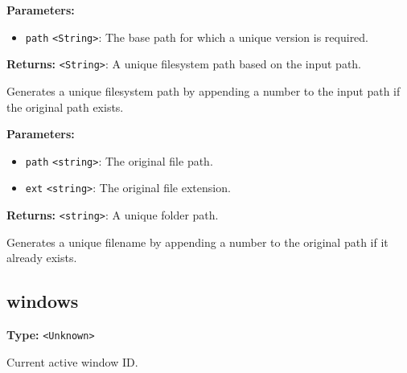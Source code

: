 \documentclass[12pt,a4paper]{article}
\begin{document}
\vspace{5mm}
\noindent {}


\noindent \textbf{Parameters:}
\begin{itemize}
  \item \texttt{path} \texttt{<String>}: The base path for which a unique version is required.
\end{itemize}

\noindent \textbf{Returns:} \texttt{<String>}: A unique filesystem path based on the input path.

\noindent Generates a unique filesystem path by appending a number to the input path if the original path exists.

\vspace{5mm}
\noindent {}


\noindent \textbf{Parameters:}
\begin{itemize}
  \item \texttt{path} \texttt{<string>}: The original file path.
  \item \texttt{ext} \texttt{<string>}: The original file extension.
\end{itemize}

\noindent \textbf{Returns:} \texttt{<string>}: A unique folder path.

\noindent Generates a unique filename by appending a number to the original path if it already exists.


\subsection{windows}
\vspace{5mm}
\noindent {}\vspace{4mm}


\noindent \textbf{Type:} \texttt{<Unknown>}

\noindent Current active window ID.

\vspace{5mm}
\noindent {}\vspace{4mm}
\end{document}
